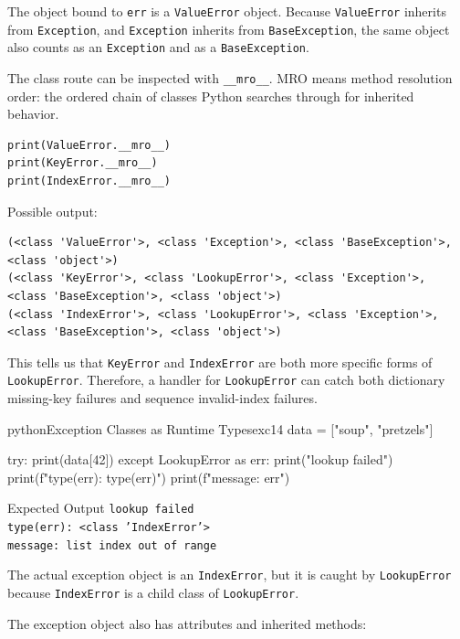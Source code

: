 \documentclass[a4paper,twoside]{report}
\begin{document}
The object bound to \texttt{err} is a \texttt{ValueError} object. Because \texttt{ValueError} inherits from \texttt{Exception}, and \texttt{Exception} inherits from \texttt{BaseException}, the same object also counts as an \texttt{Exception} and as a \texttt{BaseException}.

The class route can be inspected with \texttt{\_\_mro\_\_}. MRO means method resolution order: the ordered chain of classes Python searches through for inherited behavior.

\begin{verbatim}
print(ValueError.__mro__)
print(KeyError.__mro__)
print(IndexError.__mro__)
\end{verbatim}

Possible output:

\begin{verbatim}
(<class 'ValueError'>, <class 'Exception'>, <class 'BaseException'>, <class 'object'>)
(<class 'KeyError'>, <class 'LookupError'>, <class 'Exception'>, <class 'BaseException'>, <class 'object'>)
(<class 'IndexError'>, <class 'LookupError'>, <class 'Exception'>, <class 'BaseException'>, <class 'object'>)
\end{verbatim}

This tells us that \texttt{KeyError} and \texttt{IndexError} are both more specific forms of \texttt{LookupError}. Therefore, a handler for \texttt{LookupError} can catch both dictionary missing-key failures and sequence invalid-index failures.

\begin{codebox}[]{python}{Exception Classes as Runtime Types}{exc14}
data = ["soup", "pretzels"]

try:
    print(data[42])
except LookupError as err:
    print("lookup failed")
    print(f"type(err): {type(err)}")
    print(f"message: {err}")
\end{codebox}


\begin{iobox}{Expected Output}
\texttt{lookup failed} \\
\texttt{type(err): <class 'IndexError'>} \\
\texttt{message: list index out of range} \\
\end{iobox}


The actual exception object is an \texttt{IndexError}, but it is caught by \texttt{LookupError} because \texttt{IndexError} is a child class of \texttt{LookupError}.

The exception object also has attributes and inherited methods:
\end{document}
